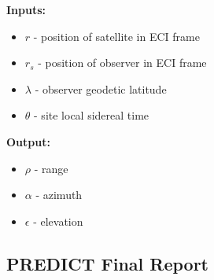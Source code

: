 \documentclass[11pt, reqno]{article}    %
\begin{document}
\noindent \textbf{Inputs: }
\begin{itemize}
    \item \(r \) -  position of satellite in ECI frame
    \item \( r_s \) - position of observer in ECI frame
    \item \( \lambda \) - observer geodetic latitude
    \item \( \theta \) - site local sidereal time
\end{itemize}

\noindent \textbf{Output: }
\begin{itemize}
    \item \( \rho \) - range
    \item \( \alpha \) - azimuth
    \item \( \epsilon \) - elevation
\end{itemize}

\subsection*{PREDICT Final Report}
\end{document}
